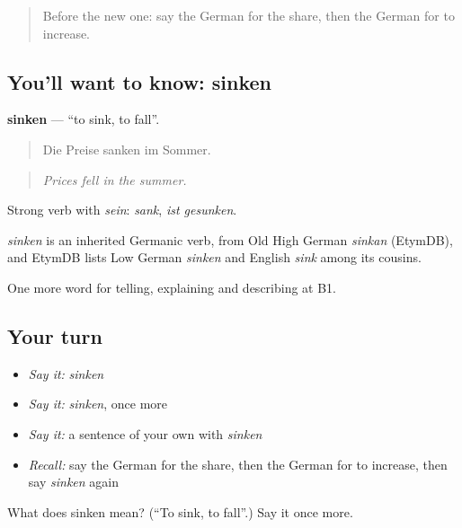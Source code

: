 \label{lesson:GE-C276-sinken}



\begin{quote}
Before the new one: say the German for the share, then the German for to increase.
\end{quote}

\subsection*{You'll want to know: sinken}
\textbf{sinken} — \textquotedblleft{}to sink, to fall\textquotedblright{}.

\begin{quote}
Die Preise sanken im Sommer.
\end{quote}

\begin{quote}
\emph{Prices fell in the summer.}
\end{quote}

Strong verb with \emph{sein}: \emph{sank}, \emph{ist gesunken}.

\begin{cousinweb}
\emph{sinken} is an inherited Germanic verb, from Old High German \emph{sinkan} (EtymDB), and EtymDB lists Low German \emph{sinken} and English \emph{sink} among its cousins.
\end{cousinweb}

\begin{grammarlens}[title={What you've built}]
One more word for telling, explaining and describing at B1.
\end{grammarlens}

\subsection*{Your turn}
\begin{itemize}
\raggedright
  \item \emph{Say it:} \emph{sinken}
  \item \emph{Say it:} \emph{sinken}, once more
  \item \emph{Say it:} a sentence of your own with \emph{sinken}
  \item \emph{Recall:} say the German for the share, then the German for to increase, then say \emph{sinken} again
\end{itemize}

\begin{tcolorbox}[breakable,colback=teal!4,colframe=teal!35!black,title={Before you move on}]
What does sinken mean? (\textquotedblleft{}To sink, to fall\textquotedblright{}.) Say it once more.
\end{tcolorbox}
